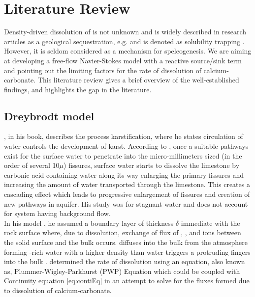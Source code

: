 \chapter{Literature Review}\label{chapter:LiteratureReview}
\thispagestyle{empty}

Density-driven dissolution of  is not unknown and is widely described in research articles as a geological sequestration, e.g.\cite{lindeberg1997reservoir, bachu2007co2} and is denoted as solubility trapping \cite{metz2005carbon}. However, it is seldom considered as a mechanism for speleogenesis. We are aiming at developing a free-flow Navier-Stokes model with a reactive source/sink term and pointing out the limiting factors for the rate of dissolution of calcium-carbonate. This literature review gives a brief overview of the well-established findings, and highlights the gap in the literature.


\section{Dreybrodt model}\label{sec:dreybrodt}
\citet{Dreybrodt2012}, in his book, describes the process karstification, where he states circulation of water controls the development of karst. According to \citet{Dreybrodt2012}, once a suitable pathways exist for the surface water to penetrate into the micro-millimeters sized (in the order of several 10$\mu$) fissures, surface water starts to dissolve the limestone by carbonic-acid containing water along its way enlarging the primary fissures and increasing the amount of water transported through the limestone. This creates a cascading effect which leads to progressive enlargement of fissures and creation of new pathways in aquifer. His study was for stagnant water and does not account for system having background flow.\\

In his model \cite{Dreybrodt2012}, he assumed a boundary layer of thickness $\delta$ immediate with the rock surface where, due to dissolution, exchange of flux of , , and  ions between the solid surface and the bulk occurs.  diffuses into the bulk from the atmosphere forming -rich water with a higher density than water triggers a protruding fingers into the bulk \cite{Class2020}. \citet{Plummer1978} determined the rate of dissolution using an equation, also known as, Plummer-Wigley-Parkhurst (PWP) Equation which could be coupled with Continuity equation \ref{eq:contiEq} in an attempt to solve for the fluxes formed due to dissolution of calcium-carbonate.
\newpage

